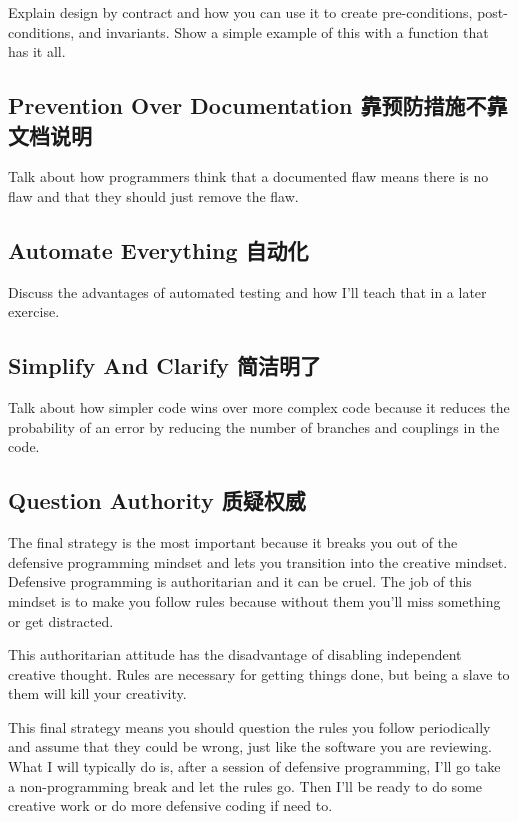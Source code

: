 Explain design by contract and how you can use it to create pre-conditions, post-conditions, and 
invariants.  Show a simple example of this with a function that has it all.

\subsection{Prevention Over Documentation 靠预防措施不靠文档说明}

Talk about how programmers think that a documented flaw means there is no flaw and that they
should just remove the flaw.

\subsection{Automate Everything 自动化}

Discuss the advantages of automated testing and how I'll teach that in a later exercise.

\subsection{Simplify And Clarify 简洁明了}

Talk about how simpler code wins over more complex code because it reduces the probability of
an error by reducing the number of branches and couplings in the code.

\subsection{Question Authority 质疑权威}

The final strategy is the most important because it breaks you out of the
defensive programming mindset and lets you transition into the creative
mindset.  Defensive programming is authoritarian and it can be cruel.  The
job of this mindset is to make you follow rules because without them you'll
miss something or get distracted.

This authoritarian attitude has the disadvantage of disabling independent 
creative thought.  Rules are necessary for getting things done, but being
a slave to them will kill your creativity.

This final strategy means you should question the rules you follow periodically
and assume that they could be wrong, just like the software you are reviewing.
What I will typically do is, after a session of defensive programming, I'll go
take a non-programming break and let the rules go.  Then I'll be ready to do
some creative work or do more defensive coding if need to.

